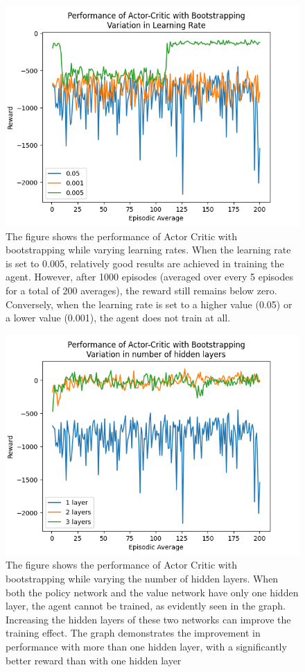 \documentclass{article}
\begin{document}
\begin{figure}[h!]
    \centering
\includegraphics[width=0.85\linewidth]{Report/images/06.Performance_of_Actor_Critic_BS_LR.png}
\caption{\label{fig:ActorCritic for different learning rates}The figure shows the performance of Actor Critic with bootstrapping while varying learning rates. When the learning rate is set to 0.005, relatively good results are achieved in training the agent. However, after 1000 episodes (averaged over every 5 episodes for a total of 200 averages), the reward still remains below zero. Conversely, when the learning rate is set to a higher value (0.05) or a lower value (0.001), the agent does not train at all.}
\end{figure}

\begin{figure}[h!]
\centering
\includegraphics[width=0.85\linewidth]{Report/images/07.Performance_of_Actor_Critic_BS_Layers.png}
\caption{\label{fig:ActorCritic for different Hidden Layers}The figure shows the performance of Actor Critic with bootstrapping while varying the number of hidden layers. When both the policy network and the value network have only one hidden layer, the agent cannot be trained, as evidently seen in the graph. Increasing the hidden layers of these two networks can improve the training effect. The graph demonstrates the improvement in performance with more than one hidden layer, with a significantly better reward than with one hidden layer}
\end{figure}
\end{document}
